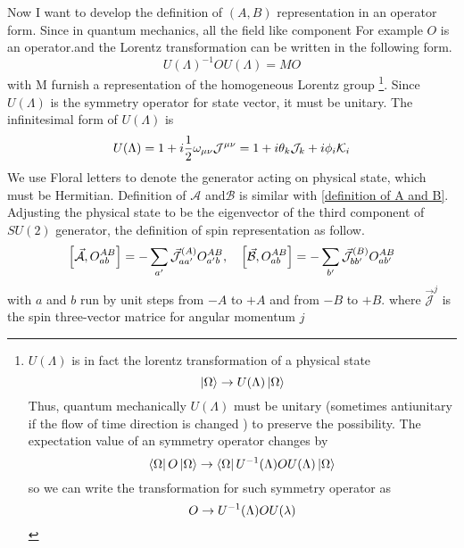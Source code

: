 Now I want to develop the definition of $(A,B)$ representation in an operator form. Since in quantum mechanics, all the field like component For example $O$ is an operator.and the Lorentz transformation can be written in the following form.
\begin{equation}
U(\Lambda)^{-1} O U(\Lambda) = M O
\end{equation}
with M furnish a representation of the homogeneous Lorentz group
\footnote{
	$U(\Lambda)$ is in fact the lorentz transformation of a physical state
	\begin{equation}
		\ket{\Omega} \rightarrow U(\Lambda) \ket{\Omega} \notag
    \end{equation}
	Thus, quantum mechanically $U(\Lambda)$ must be unitary (sometimes antiunitary if the flow of time direction is changed ) to preserve the possibility. 
	The expectation value of an symmetry operator changes by
	\begin{equation} 
	\bra{\Omega}O\ket{\Omega}\rightarrow \bra{\Omega} U^{-1}(\Lambda)O U(\Lambda)\ket{\Omega} \notag
	\end{equation}
	so we can write the transformation for such symmetry operator as
	\begin{equation}
	O \rightarrow  U^{-1}(\Lambda)O U(\lambda)\notag
	\end{equation}
}.
Since $U(\Lambda)$ is the symmetry operator for state vector, it must be unitary. The infinitesimal form of $U(\Lambda)$ is
\begin{equation} \label{infinitesimal form of ULa}
U(\Lambda) = 1 +  i\frac{1}{2} \omega_{\mu\nu} \mathcal{J}^{\mu\nu}
=1 +  i \theta_k \mathcal{J}_k + i \phi_i \mathcal{K}_i
\end{equation}
We use Floral letters to denote the generator acting on physical state, which must be Hermitian. Definition of $\mathcal{A}$ and$\mathcal{B}$ is similar with \eqref{definition of A and B}. 
Adjusting the physical state to be the eigenvector of the third component of $SU(2)$ generator, the definition of spin representation as follow.
\begin{equation} \label{the definition of spin representation}
\comm{\vec{\mathcal{A}}}{O_{ab}^{AB}} = -\sum_{a'}\vec{\mathcal{J}}^{(A)}_{aa'}O^{AB}_{a'b},\quad
\comm{\vec{\mathcal{B}}}{O_{ab}^{AB}} = -\sum_{b'}\vec{\mathcal{J}}^{(B)}_{bb'}O^{AB}_{ab'}
\end{equation}
with $a$ and $b$ run by unit steps from $-A$ to $+A$ and from $-B$ to $+B$. where $\vec{\mathcal{J}}^{j}$ is the spin three-vector  matrice for angular momentum $j$
